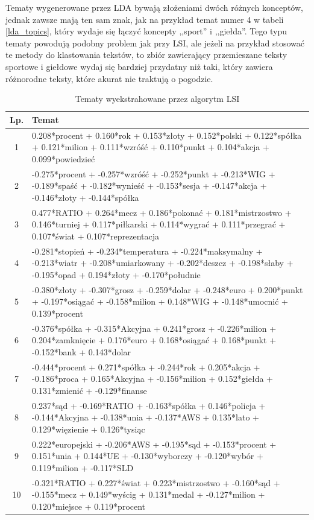 \documentclass[11pt,a4paper]{article}
\begin{document}
Tematy wygenerowane przez LDA bywają złożeniami dwóch różnych konceptów, jednak
zawsze mają ten sam znak, jak na przykład temat numer 4 w tabeli
\ref{lda_topics}, który wydaje się łączyć koncepty ,,sport'' i ,,giełda''. Tego
typu tematy powodują podobny problem jak przy LSI, ale jeżeli na przykład
stosować te metody do klastowania tekstów, to zbiór zawierający przemieszane
teksty sportowe i giełdowe wydaj się bardziej przydatny niż taki, który zawiera
różnorodne teksty, które akurat nie traktują o pogodzie.

\begin{table}[h]
\caption{Tematy wyekstrahowane przez algorytm LSI}
\label{lsi_topics}
\begin{tabular}{|c|p{\linewidth}|}
\hline
Lp. & Temat \\\hline

1 & 0.208*procent + 0.160*rok + 0.153*złoty + 0.152*polski + 0.122*spółka + 0.121*milion + 0.111*wzróść + 0.110*punkt + 0.104*akcja + 0.099*powiedzieć\\\hline
2 & -0.275*procent + -0.257*wzróść + -0.252*punkt + -0.213*WIG + -0.189*spaść + -0.182*wynieść + -0.153*sesja + -0.147*akcja + -0.146*złoty + -0.144*spółka\\\hline
3 & 0.477*RATIO + 0.264*mecz + 0.186*pokonać + 0.181*mistrzostwo + 0.146*turniej + 0.117*piłkarski + 0.114*wygrać + 0.111*przegrać + 0.107*świat + 0.107*reprezentacja\\\hline
4 & -0.281*stopień + -0.234*temperatura + -0.224*maksymalny + -0.213*wiatr + -0.208*umiarkowany + -0.202*deszcz + -0.198*słaby + -0.195*opad + 0.194*złoty + -0.170*południe\\\hline
5 & -0.380*złoty + -0.307*grosz + -0.259*dolar + -0.248*euro + 0.200*punkt + -0.197*osiągać + -0.158*milion + 0.148*WIG + -0.148*umocnić + 0.139*procent\\\hline
6 & -0.376*spółka + -0.315*Akcyjna + 0.241*grosz + -0.226*milion + 0.204*zamknięcie + 0.176*euro + 0.168*osiągać + 0.168*punkt + -0.152*bank + 0.143*dolar\\\hline
7 & -0.444*procent + 0.271*spółka + -0.244*rok + 0.205*akcja + -0.186*proca + 0.165*Akcyjna + -0.156*milion + 0.152*giełda + 0.131*zmienić + -0.129*finanse\\\hline
8 & 0.237*sąd + -0.169*RATIO + -0.163*spółka + 0.146*policja + -0.144*Akcyjna + -0.138*unia + -0.137*AWS + 0.135*lato + 0.129*więzienie + 0.126*tysiąc\\\hline
9 & 0.222*europejski + -0.206*AWS + -0.195*sąd + -0.153*procent + 0.151*unia + 0.144*UE + -0.130*wyborczy + -0.120*wybór + 0.119*milion + -0.117*SLD\\\hline
10 & -0.321*RATIO + 0.227*świat + 0.223*mistrzostwo + -0.160*sąd + -0.155*mecz + 0.149*wyścig + 0.131*medal + -0.127*milion + 0.120*miejsce + 0.119*procent\\\hline
\end{tabular}
\end{table}
\end{document}
